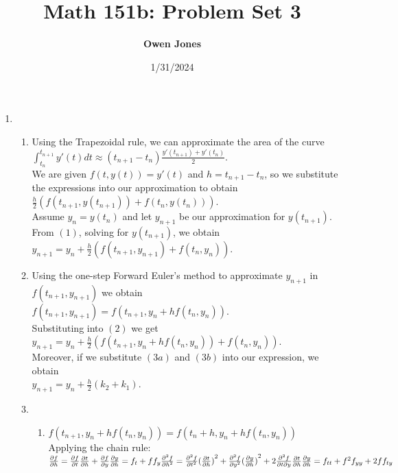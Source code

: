 \documentclass[10pt]{article}
\title{\bf Math 151b: Problem Set 3}
\date{1/31/2024}
\author{\bf Owen Jones}
\begin{document}
\maketitle
\begin{enumerate}[label=\bf{Problem \arabic*}.]
    \item \begin{enumerate}
        \item Using the Trapezoidal rule, we can approximate the area of the curve\\
        $\displaystyle \int_{t_n}^{t_{n+1}}y'(t)dt\approx (t_{n+1}-t_n)\frac{y'(t_{n+1})+y'(t_{n})}{2}$.\\
        We are given $f(t,y(t))=y'(t)$ and $h=t_{n+1}-t_n$, so we substitute the expressions into our approximation to obtain\\ 
        $\frac{h}{2}(f(t_{n+1},y(t_{n+1}))+f(t_n,y(t_n)))$.\\
        Assume $y_n=y(t_n)$ and let $y_{n+1}$ be our approximation for $y(t_{n+1})$.\\
        From $(1)$, solving for $y(t_{n+1})$, we obtain\\
        $y_{n+1}=y_n+\frac{h}{2}(f(t_{n+1},y_{n+1})+f(t_n,y_n))$.
        \item Using the one-step Forward Euler's method to approximate $y_{n+1}$ in $f(t_{n+1},y_{n+1})$ we obtain\\
        $f(t_{n+1},y_{n+1})=f(t_{n+1},y_n+hf(t_n,y_n))$.\\
        Substituting into $(2)$ we get\\
        $y_{n+1}=y_n+\frac{h}{2}(f(t_{n+1},y_n+hf(t_n,y_n))+f(t_n,y_n))$.\\
        Moreover, if we substitute $(3a)$ and $(3b)$ into our expression, we obtain\\
        $y_{n+1}=y_n+\frac{h}{2}(k_2+k_1)$.
        \item \begin{enumerate}
            \item $f(t_{n+1},y_n+hf(t_n,y_n))=f(t_n+h,y_n+hf(t_n,y_n))$\\
            Applying the chain rule:\\
            $\frac{\partial f}{\partial h}=\frac{\partial f}{\partial t}\frac{\partial t}{\partial h}+\frac{\partial f}{\partial y}\frac{\partial y}{\partial h}=f_t+ff_y\\
            \frac{\partial^2f}{\partial h^2}=\frac{\partial^2f}{\partial t^2}{(\frac{\partial t}{\partial h})}^2+\frac{\partial^2f}{\partial y^2}{(\frac{\partial y}{\partial h})}^2+2\frac{\partial^2f}{\partial t\partial y}\frac{\partial t}{\partial h}\frac{\partial y}{\partial h}=f_{tt}+f^2f_{yy}+2ff_{ty}$
            

\end{enumerate}
\end{enumerate}
\end{enumerate}
\end{document}
